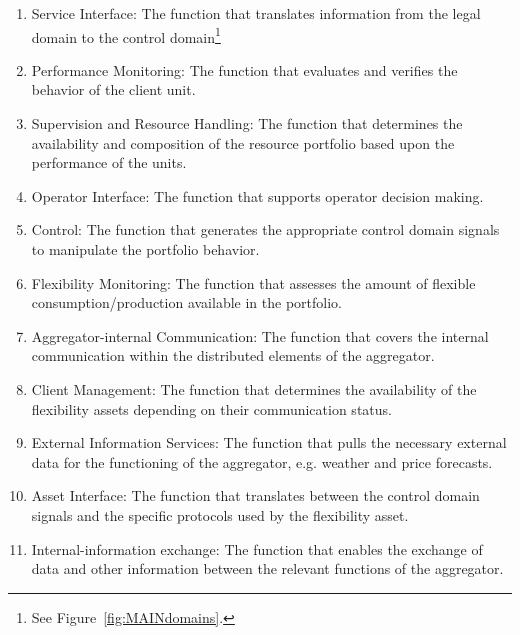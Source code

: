 \begin{enumerate}[label=\Alph*]
	\item Service Interface: The function that translates information from the legal domain to the control domain\footnote{See Figure~\ref{fig:MAINdomains}.}
	\item Performance Monitoring: The function that evaluates and verifies the behavior of the client unit.
	\item Supervision and Resource Handling: The function that determines the availability and composition of the resource portfolio based upon the performance of the units.
	\item Operator Interface: The function that supports operator decision making.
	\item Control: The function that generates the appropriate control domain signals to manipulate the portfolio behavior.
	\item Flexibility Monitoring: The function that assesses the amount of flexible consumption/production available in the portfolio.
	\item Aggregator-internal Communication: The function that covers the internal communication within the distributed elements of the aggregator.
	\item Client Management: The function that determines the availability of the flexibility assets depending on their communication status.
	\item External Information Services: The function that pulls the necessary external data for the functioning of the aggregator, e.g. weather and price forecasts.
	\item Asset Interface: The function that translates between the control domain signals and the specific protocols used by the flexibility asset.
	\item Internal-information exchange: The function that enables the exchange of data and other information between the relevant functions of the aggregator.
\end{enumerate}

